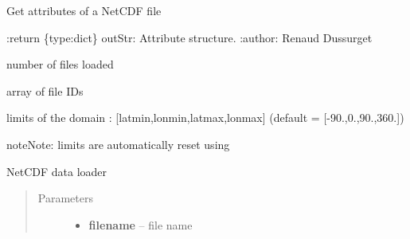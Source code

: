 \documentclass[letterpaper,10pt,english]{sphinxmanual}
\begin{document}
\begin{fulllineitems}
\begin{fulllineitems}
\label{altimetry.tools.nctools:altimetry.tools.nctools.nc.attributes}
Get attributes of a NetCDF file

:return \{type:dict\} outStr: Attribute structure.
:author: Renaud Dussurget

\end{fulllineitems}


\begin{fulllineitems}
\label{altimetry.tools.nctools:altimetry.tools.nctools.nc.count}
number of files loaded

\end{fulllineitems}


\begin{fulllineitems}
\label{altimetry.tools.nctools:altimetry.tools.nctools.nc.fileid}
array of file IDs

\end{fulllineitems}


\begin{fulllineitems}
\label{altimetry.tools.nctools:altimetry.tools.nctools.nc.limit}
limits of the domain : {[}latmin,lonmin,latmax,lonmax{]} (default = {[}-90.,0.,90.,360.{]})

\begin{notice}{note}{Note:}
limits are automatically reset using 
\end{notice}

\end{fulllineitems}


\begin{fulllineitems}
\label{altimetry.tools.nctools:altimetry.tools.nctools.nc.load}
NetCDF data loader
\begin{quote}\begin{description}
\item[{Parameters}] \leavevmode\begin{itemize}
\item {} 
\textbf{filename} -- file name


\end{itemize}
\end{description}
\end{quote}
\end{fulllineitems}
\end{fulllineitems}
\end{document}
